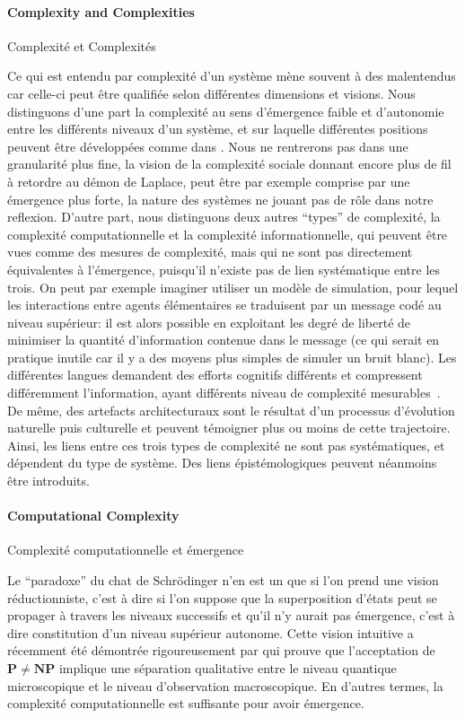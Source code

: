 \paragraph{Complexity and Complexities}{Complexité et Complexités}

Ce qui est entendu par complexité d'un système mène souvent à des malentendus car celle-ci peut être qualifiée selon différentes dimensions et visions. Nous distinguons d'une part la complexité au sens d'émergence faible et d'autonomie entre les différents niveaux d'un système, et sur laquelle différentes positions peuvent être développées comme dans \cite{deffuant2015visions}. Nous ne rentrerons pas dans une granularité plus fine, la vision de la complexité sociale donnant encore plus de fil à retordre au démon de Laplace, peut être par exemple comprise par une émergence plus forte, la nature des systèmes ne jouant pas de rôle dans notre reflexion. D'autre part, nous distinguons deux autres ``types'' de complexité, la complexité computationnelle et la complexité informationnelle, qui peuvent être vues comme des mesures de complexité, mais qui ne sont pas directement équivalentes à l'émergence, puisqu'il n'existe pas de lien systématique entre les trois. On peut par exemple imaginer utiliser un modèle de simulation, pour lequel les interactions entre agents élémentaires se traduisent par un message codé au niveau supérieur: il est alors possible en exploitant les degré de liberté de minimiser la quantité d'information contenue dans le message (ce qui serait en pratique inutile car il y a des moyens plus simples de simuler un bruit blanc). Les différentes langues demandent des efforts cognitifs différents et compressent différemment l'information, ayant différents niveau de complexité mesurables~\cite{febres2013complexity}. De même, des artefacts architecturaux sont le résultat d'un processus d'évolution naturelle puis culturelle et peuvent témoigner plus ou moins de cette trajectoire. Ainsi, les liens entre ces trois types de complexité ne sont pas systématiques, et dépendent du type de système. Des liens épistémologiques peuvent néanmoins être introduits.


\paragraph{Computational Complexity}{Complexité computationnelle et émergence}

Le ``paradoxe'' du chat de Schrödinger n'en est un que si l'on prend une vision réductionniste, c'est à dire si l'on suppose que la superposition d'états peut se propager à travers les niveaux successifs et qu'il n'y aurait pas émergence, c'est à dire constitution d'un niveau supérieur autonome. Cette vision intuitive a récemment été démontrée rigoureusement par \cite{2014arXiv1403.7686B} qui prouve que l'acceptation de $\mathbf{P}\neq\mathbf{NP}$ implique une séparation qualitative entre le niveau quantique microscopique et le niveau d'observation macroscopique. En d'autres termes, la complexité computationnelle est suffisante pour avoir émergence.


